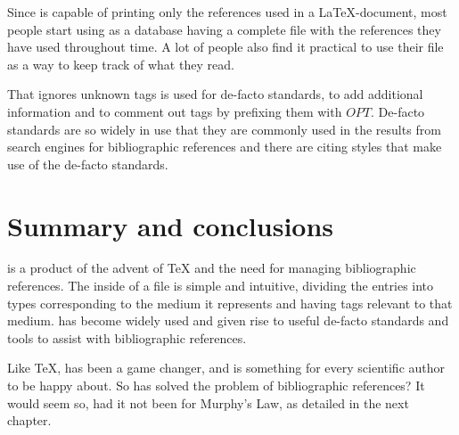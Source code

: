 Since {\bibtex} is capable of printing only the references used in a
{\LaTeX}-document, most people start using {\bibtex} as a database
having a complete file with the references they have used throughout
time.  A lot of people also find it practical to use their {\bibtex}
file as a way to keep track of what they read.

That {\bibtex} ignores unknown tags is used for de-facto standards, to
add additional information and to comment out tags by prefixing them
with $OPT$.  De-facto standards are so widely in use that they are
commonly used in the results from search engines for bibliographic
references and there are citing styles that make use of the de-facto
standards.


\section{Summary and conclusions}
\label{sec:about_conclusion}


{\bibtex} is a product of the advent of {\TeX} and the need for
managing bibliographic references.  The inside of a {\bibtex} file is
simple and intuitive, dividing the entries into types corresponding
to the medium it represents and having tags relevant to that medium.
{\bibtex} has become widely used and given rise to useful de-facto
standards and tools to assist with bibliographic references.

Like {\TeX}, {\bibtex} has been a game changer, and is something for
every scientific author to be happy about.  So has {\bibtex} solved the
problem of bibliographic references? It would seem so, had it not been
for Murphy's Law, as detailed in the next chapter.


%
%

